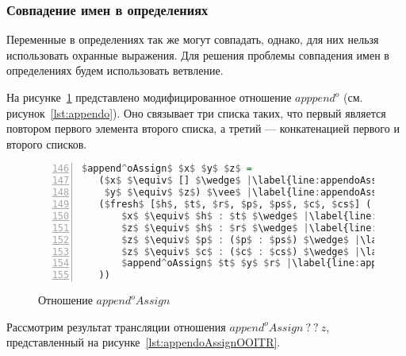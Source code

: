 
\subsubsection{Совпадение имен в определениях}

Переменные в определениях так же могут совпадать, однако, для них нельзя использовать охранные выражения.
Для решения проблемы совпадения имен в определениях будем использовать ветвление.

На рисунке~\ref{lst:appendoAssign} представлено модифицированное отношение $apppend^o$ (см. рисунок~\ref{lst:appendo}).
Оно связывает три списка таких, что первый является повтором первого элемента второго списка, а третий --- конкатенацией первого и второго списков.

\begin{figure}[h!]
  \begin{center}
  \begin{minipage}{0.67\textwidth}
  \begin{lstlisting}[language=Haskell, frame=single, numbers=left,numberstyle=\small, firstnumber=146, escapechar=|]
 $append^oAssign$ $x$ $y$ $z$ =
   ($x$ $\equiv$ [] $\wedge$ |\label{line:appendoAssign2}|
    $y$ $\equiv$ $z$) $\vee$ |\label{line:appendoAssign3}|
   ($fresh$ [$h$, $t$, $r$, $p$, $ps$, $c$, $cs$] (
       $x$ $\equiv$ $h$ : $t$ $\wedge$ |\label{line:appendoAssign5}|
       $z$ $\equiv$ $h$ : $r$ $\wedge$ |\label{line:appendoAssign6}|
       $z$ $\equiv$ $p$ : ($p$ : $ps$) $\wedge$ |\label{line:appendoAssign7}|
       $z$ $\equiv$ $c$ : ($c$ : $cs$) $\wedge$ |\label{line:appendoAssign8}|
       $append^oAssign$ $t$ $y$ $r$ |\label{line:appendoAssign9}|
   ))
    \end{lstlisting}
  \end{minipage}
  \end{center}
  \caption{Отношение $append^oAssign$}
  \label{lst:appendoAssign}
\end{figure}

Рассмотрим результат трансляции отношения $append^oAssign \ ? \ ? \ z$, представленный на рисунке~\ref{lst:appendoAssignOOITR}.

